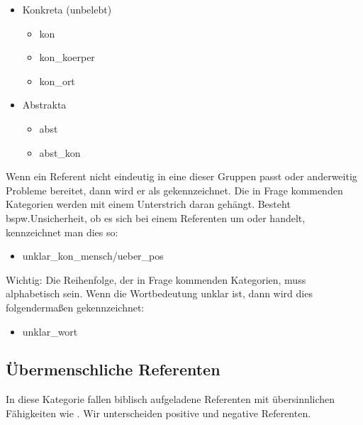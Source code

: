 {\vspace{-3ex}
\noindent\parbox[t]{2.4in}{\raggedright%
\begin{itemize}
\item Konkreta (unbelebt)
  \begin{itemize}
    \setlength{\itemsep}{-5pt}
  \item kon
  \item kon\_koerper
  \item kon\_ort
  \end{itemize}
\end{itemize} 
}%
\hfill%
\parbox[t]{2.4in}{\raggedright%
\begin{itemize}
\item Abstrakta
  \begin{itemize}
    \setlength{\itemsep}{-5pt}
  \item abst
  \item abst\_kon
  \end{itemize}
\end{itemize}
}


Wenn ein Referent nicht eindeutig in eine dieser Gruppen passt oder anderweitig Probleme bereitet, dann wird er als   gekennzeichnet. Die in Frage kommenden Kategorien werden mit einem Unterstrich daran gehängt. Besteht bspw.\thinspace{}Unsicherheit, ob es sich bei einem Referenten um  oder  handelt, kennzeichnet man dies so: 

\begin{itemize}
\item unklar\_kon\_mensch/ueber\_pos
\end{itemize}

\noindent 
Wichtig: Die Reihenfolge, der in Frage kommenden Kategorien, muss alphabetisch sein. Wenn die Wortbedeutung unklar ist, dann wird dies folgendermaßen gekennzeichnet: 
\begin{itemize}
\item unklar\_wort
\end{itemize}


\subsection{Übermenschliche Referenten}\label{ueber}

In diese Kategorie fallen biblisch aufgeladene Referenten mit übersinnlichen Fähigkeiten wie . Wir unterscheiden positive und negative Referenten. 

}
